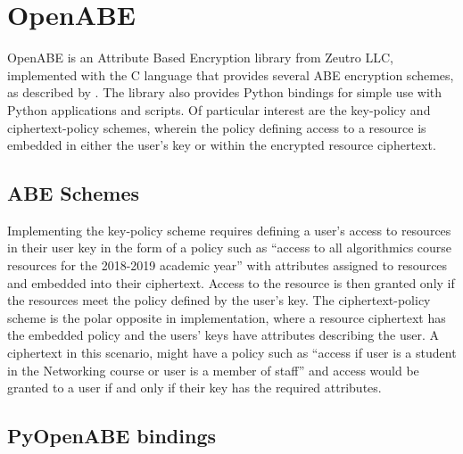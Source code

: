 \section{OpenABE}
\label{sec:bkgr_openabe}

OpenABE is an Attribute Based Encryption library from Zeutro LLC, implemented with the C language that provides several ABE encryption schemes, as described by \citet{Akinyele2011}. The library also provides Python bindings for simple use with Python applications and scripts. Of particular interest are the key-policy and ciphertext-policy schemes, wherein the policy defining access to a resource is embedded in either the user's key or within the encrypted resource ciphertext.

\subsection{ABE Schemes}
\label{subsec:bkgr_openabe_schemes}

Implementing the key-policy scheme requires defining a user's access to resources in their user key in the form of a policy such as ``access to all algorithmics course resources for the 2018-2019 academic year'' with attributes assigned to resources and embedded into their ciphertext. Access to the resource is then granted only if the resources meet the policy defined by the user's key. The ciphertext-policy scheme is the polar opposite in implementation, where a resource ciphertext has the embedded policy and the users' keys have attributes describing the user. A ciphertext in this scenario, might have a policy such as ``access if user is a student in the Networking course or user is a member of staff'' and access would be granted to a user if and only if their key has the required attributes.

\subsection{PyOpenABE bindings}
\label{subsec:bkgr_pyopenabe}

